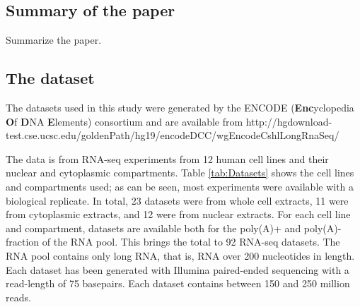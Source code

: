 %








\subsection{Summary of the paper}
Summarize the paper.

\subsection{The dataset}
The datasets used in this study were generated by the ENCODE
(\textbf{Enc}yclopedia \textbf{O}f \textbf{D}NA \textbf{E}lements) consortium
and are available from http://hgdownload-test.cse.ucsc.edu/goldenPath/hg19/encodeDCC/wgEncodeCshlLongRnaSeq/

The data is from RNA-seq experiments from 12 human cell lines and their
nuclear and cytoplasmic compartments. Table \ref{tab:Datasets} shows the cell
lines and compartments used; as can be seen, most experiments were available
with a biological replicate. In total, 23 datasets were from whole cell
extracts, 11 were from cytoplasmic extracts, and 12 were from nuclear extracts.
For each cell line and compartment, datasets are available both for the
poly(A)+ and poly(A)- fraction of the RNA pool. This brings the total to 92
RNA-seq datasets. The RNA pool contains only long RNA, that is, RNA over 200
nucleotides in length. Each dataset has been generated with Illumina
paired-ended sequencing with a read-length of 75 basepairs. Each dataset
contains between 150 and 250 million reads.

